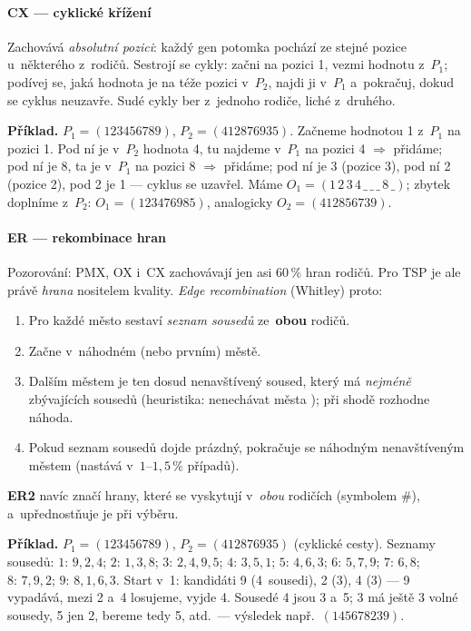 \documentclass[11pt,a4paper]{article}
\theoremstyle{definition}
\begin{document}
\paragraph{CX --- cyklické křížení}

\begin{defbox}
Zachovává \emph{absolutní pozici}: každý gen potomka pochází ze stejné pozice
u~některého z~rodičů. Sestrojí se cykly: začni na pozici 1, vezmi hodnotu
z~$P_1$; podívej se, jaká hodnota je na téže pozici v~$P_2$, najdi ji v~$P_1$
a~pokračuj, dokud se cyklus neuzavře. Sudé cykly ber z~jednoho rodiče, liché
z~druhého.
\end{defbox}

\textbf{Příklad.} $P_1 = (123456789)$, $P_2 = (412876935)$.
Začneme hodnotou 1 z~$P_1$ na pozici 1. Pod ní je v~$P_2$ hodnota 4, tu najdeme
v~$P_1$ na pozici 4 $\Rightarrow$ přidáme; pod ní je 8, ta je v~$P_1$ na pozici
8 $\Rightarrow$ přidáme; pod ní je 3 (pozice 3), pod ní 2 (pozice 2), pod 2 je
1 --- cyklus se uzavřel. Máme
$O_1 = (1\,2\,3\,4\,\_\,\_\,\_\,8\,\_)$; zbytek doplníme z~$P_2$:
$O_1 = (123476985)$, analogicky $O_2 = (412856739)$.

\paragraph{ER --- rekombinace hran}

Pozorování: PMX, OX i~CX zachovávají jen asi $60\,\%$ hran rodičů. Pro TSP
je ale právě \emph{hrana} nositelem kvality. \emph{Edge recombination}
(Whitley) proto:
\begin{enumerate}
\item Pro každé město sestaví \emph{seznam sousedů} ze~\textbf{obou} rodičů.
\item Začne v~náhodném (nebo prvním) městě.
\item Dalším městem je ten dosud nenavštívený soused, který má \emph{nejméně}
  zbývajících sousedů (heuristika: nenechávat města ); při
  shodě rozhodne náhoda.
\item Pokud seznam sousedů dojde prázdný, pokračuje se náhodným nenavštíveným
  městem (nastává v~$1$--$1{,}5\,\%$ případů).
\end{enumerate}
\textbf{ER2} navíc značí hrany, které se vyskytují v~\emph{obou} rodičích
(symbolem \#), a~upřednostňuje je při výběru.

\textbf{Příklad.} $P_1 = (123456789)$, $P_2 = (412876935)$ (cyklické cesty).
Seznamy sousedů: $1{:}\,9,2,4$; $2{:}\,1,3,8$; $3{:}\,2,4,9,5$; $4{:}\,3,5,1$;
$5{:}\,4,6,3$; $6{:}\,5,7,9$; $7{:}\,6,8$; $8{:}\,7,9,2$; $9{:}\,8,1,6,3$.
Start v~1: kandidáti 9 (4~sousedi), 2 (3), 4 (3) --- 9 vypadává, mezi 2 a~4
losujeme, vyjde 4. Sousedé 4 jsou 3 a~5; 3 má ještě 3 volné sousedy, 5 jen 2,
bereme tedy 5, atd.\ --- výsledek např.\ $(145678239)$.
\end{document}
